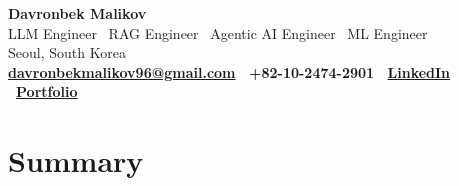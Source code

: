 \documentclass[11pt,a4paper]{article}
\newcommand{\name}[1]{{\Huge\bfseries #1}}
\begin{document}
\begin{center}
\name{Davronbek Malikov} \\[2mm]
LLM Engineer \textbar\ RAG Engineer \textbar\ Agentic AI Engineer \textbar\ ML Engineer \\
Seoul, South Korea \\[1mm]
\textbf{
  \href{mailto:davronbekmalikov96@gmail.com}{davronbekmalikov96@gmail.com}
  \textbar\ +82-10-2474-2901
  \textbar\ \href{https://www.linkedin.com/in/davronbek-malikov}{LinkedIn}
  \textbar\ \href{https://davronbek-portfolio.vercel.app}{Portfolio}
}
\end{center}

\section*{Summary}
\end{document}
